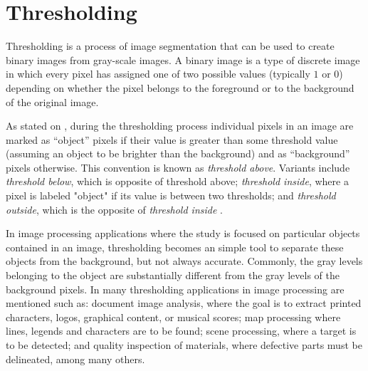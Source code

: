\section{Thresholding}
\label{sec:thresholding}

Thresholding is a process of image segmentation that can be used to create
binary images from gray-scale images. A binary image is a type of discrete image in
 which every pixel has assigned one of two possible values (typically 
$1$ or $0$) depending on whether the pixel belongs
to the foreground or to the background of the original image.

As stated on \cite{web:thresholding}, during the thresholding process individual 
pixels in an image are marked as ``object'' pixels if 
their value is greater than some threshold value (assuming an object to be brighter than the 
background) and as ``background'' pixels otherwise. This convention is known as \emph{threshold above}. 
Variants include \emph{threshold below}, which is opposite of threshold above; \emph{threshold inside}, where a 
pixel is labeled "object" if its value is between two thresholds; and \emph{threshold outside}, which is 
the opposite of \emph{threshold inside} \cite{shapiro}.

In image processing applications where the study is focused on particular objects contained
in an image, thresholding becomes an simple tool to separate these objects from
the background, but not always accurate. Commonly, the gray levels belonging to the object are substantially
different from the gray levels of the background pixels. In \cite[p.146]{thres} many thresholding
applications in image processing are mentioned such as: document image analysis, where the goal
is to extract printed characters, logos, graphical content, or musical scores; map processing
where lines, legends and characters are to be found; scene processing, where a target is to
be detected; and quality inspection of materials, where defective parts must be delineated,
among many others. \\

